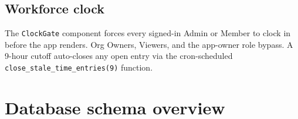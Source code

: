 \documentclass[11pt,a4paper,oneside]{article}
\newcommand{\code}[1]{\texttt{\small #1}}
\begin{document}
\subsection{Workforce clock}

The \code{ClockGate} component forces every signed-in Admin or
Member to clock in before the app renders. Org Owners, Viewers, and
the app-owner role bypass. A 9-hour cutoff auto-closes any open
entry via the cron-scheduled \code{close\_stale\_time\_entries(9)}
function.

\section{Database schema overview}\label{sec:schema}
\end{document}
